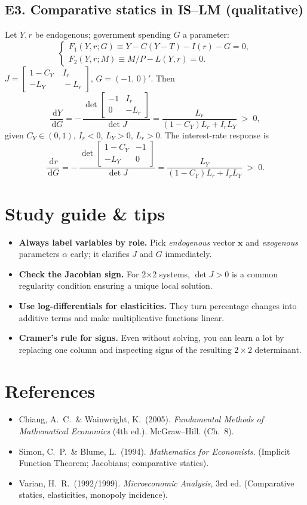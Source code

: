 \documentclass[11pt]{article}
\newcommand{\dd}{\,\mathrm{d}}
\newcommand{\vect}[1]{\bm{#1}}
\begin{document}
\subsection*{E3. Comparative statics in IS--LM (qualitative)}
Let $Y,r$ be endogenous; government spending $G$ a parameter:
\[
\begin{cases}
F_1(Y,r;G) \equiv Y - C(Y-T) - I(r) - G = 0,\\
F_2(Y,r;M) \equiv M/P - L(Y,r) = 0.
\end{cases}
\]
$J=\begin{bmatrix}1-C_Y & \; I_r\\ -L_Y & \; -L_r\end{bmatrix}$, $G=( -1,\,0)'$.
Then
\[
\frac{\dd Y}{\dd G} = -\,\frac{\det \begin{bmatrix} -1 & I_r\\ 0 & -L_r\end{bmatrix}}{\det J}
=\frac{L_r}{(1-C_Y)L_r + I_r L_Y}\;>\;0,
\]
given $C_Y\in(0,1)$, $I_r<0$, $L_Y>0$, $L_r>0$. The interest-rate response is
\[
\frac{\dd r}{\dd G} = -\,\frac{\det \begin{bmatrix} 1-C_Y & -1\\ -L_Y & 0\end{bmatrix}}{\det J}
=\frac{L_Y}{(1-C_Y)L_r + I_r L_Y}\;>\;0.
\]

\section*{Study guide \& tips}
\begin{itemize}
\item \textbf{Always label variables by role.} Pick \emph{endogenous} vector $\vect{x}$ and \emph{exogenous} parameters $\alpha$ early; it clarifies $J$ and $G$ immediately.
\item \textbf{Check the Jacobian sign.} For 2$\times$2 systems, $\det J>0$ is a common regularity condition ensuring a unique local solution.
\item \textbf{Use log-differentials for elasticities.} They turn percentage changes into additive terms and make multiplicative functions linear.
\item \textbf{Cramer's rule for signs.} Even without solving, you can learn a lot by replacing one column and inspecting signs of the resulting $2\times2$ determinant.
\end{itemize}

\newpage
\section*{References}
\begin{itemize}
\item Chiang, A.\ C.\ \& Wainwright, K.\ (2005). \emph{Fundamental Methods of Mathematical Economics} (4th ed.). McGraw--Hill. (Ch.~8).
\item Simon, C.\ P.\ \& Blume, L.\ (1994). \emph{Mathematics for Economists}. (Implicit Function Theorem; Jacobians; comparative statics).
\item Varian, H.\ R.\ (1992/1999). \emph{Microeconomic Analysis}, 3rd ed. (Comparative statics, elasticities, monopoly incidence).
\end{itemize}
\end{document}
